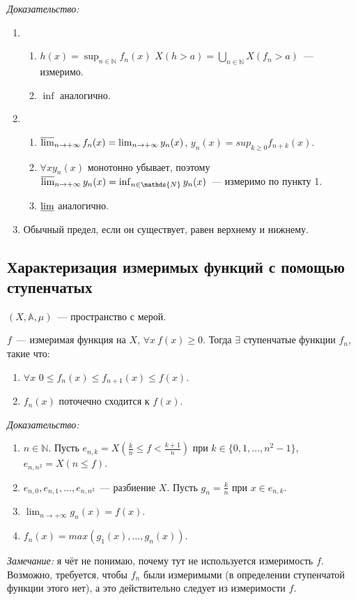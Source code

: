 \documentclass[paper=a4, fontsize=11pt]{article}
\begin{document}
\emph{Доказательство:}
\begin{enumerate}
    \item 
    \begin{enumerate}
        \item $h(x) = \sup_{n \in \mathds{N}} f_n(x)$ $X(h>a) = \bigcup_{n \in \mathds{N}} X(f_n > a)$~--- измеримо.
        \item $\inf$ аналогично.
    \end{enumerate}
    \item
    \begin{enumerate}
        \item $\varlimsup_{n \to +\infty} f_n(x) = \lim_{n \to +\infty} y_n(x)$, $y_n(x) = sup_{k \geq 0} f_{n+k}(x)$.
        \item $\forall x y_n(x)$ монотонно убывает, поэтому $\varlimsup_{n \to +\infty} y_n(x) = \inf_{n \in \mathds{N}} y_n(x)$~---
        измеримо по пункту 1.
        \item $\varliminf$ аналогично.
    \end{enumerate}
    \item Обычный предел, если он существует, равен верхнему и нижнему.
\end{enumerate}

\subsection{Характеризация измеримых функций с помощью ступенчатых}
$(X,\mathds{A},\mu)$~--- пространство с мерой.

$f$~--- измеримая функция на $X$, $\forall x\ f(x) \geq 0$. Тогда $\exists$ ступенчатые функции $f_n$, такие что:
\begin{enumerate}
    \item $\forall x$ $0 \leq f_n(x) \leq f_{n+1}(x) \leq f(x)$.
    \item $f_n(x)$ поточечно сходится к $f(x)$.
\end{enumerate}

\emph{Доказательство:}
\begin{enumerate}
    \item $n \in \mathds{N}$. Пусть $e_{n,k} = X(\frac{k}{n} \leq f < \frac{k+1}{n})$ при $k \in \{0,1,\dots,n^2-1\}$,
    $e_{n,n^2} = X(n \leq f)$.
    \item $e_{n,0}, e_{n,1}, \dots, e_{n,n^2}$~--- разбиение $X$. Пусть $g_n = \frac{k}{n}$ при $x \in e_{n,k}$.
    \item $\lim_{n \to +\infty} g_n(x) = f(x)$.
    \item $f_n(x) = max(g_1(x),\dots,g_n(x))$.
\end{enumerate}
\emph{Замечание:} я чёт не понимаю, почему тут не используется измеримость $f$. Возможно, требуется, чтобы $f_n$ были
измеримыми (в определении ступенчатой функции этого нет), а это действительно следует из измеримости $f$.
\end{document}
